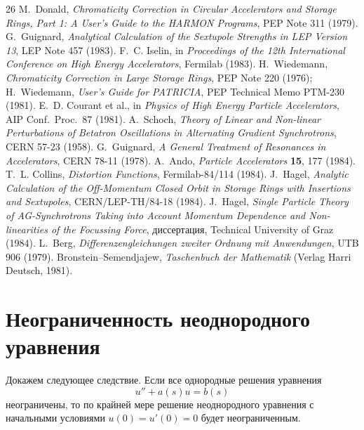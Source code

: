 \documentclass[11pt,a4paper]{article}
\begin{document}
\begin{thebibliography}{26}
M.~Donald, \textit{Chromaticity Correction in Circular Accelerators and Storage
Rings, Part 1: A User's Guide to the HARMON Programs}, PEP Note 311 (1979).
G.~Guignard, \textit{Analytical Calculation of the Sextupole Strengths in LEP
Version 13}, LEP Note 457 (1983).
F.~C. Iselin, in \textit{Proceedings of the 12th International Conference on High
Energy Accelerators}, Fermilab (1983).
H.~Wiedemann, \textit{Chromaticity Correction in Large Storage Rings}, PEP Note
220 (1976); H.~Wiedemann, \textit{User's Guide for PATRICIA}, PEP Technical Memo
PTM-230 (1981).
E.~D. Courant et al., in \textit{Physics of High Energy Particle Accelerators},
AIP Conf.\ Proc.\ 87 (1981).
A.~Schoch, \textit{Theory of Linear and Non-linear Perturbations of Betatron
Oscillations in Alternating Gradient Synchrotrons}, CERN 57-23 (1958).
G.~Guignard, \textit{A General Treatment of Resonances in Accelerators}, CERN
78-11 (1978).
A.~Ando, \textit{Particle Accelerators} \textbf{15}, 177 (1984).
T.~L. Collins, \textit{Distortion Functions}, Fermilab-84/114 (1984).
J.~Hagel, \textit{Analytic Calculation of the Off-Momentum Closed Orbit in Storage
Rings with Insertions and Sextupoles}, CERN/LEP-TH/84-18 (1984).
J.~Hagel, \textit{Single Particle Theory of AG-Synchrotrons Taking into Account
Momentum Dependence and Non-linearities of the Focussing Force}, диссертация,
Technical University of Graz (1984).
L.~Berg, \textit{Differenzengleichungen zweiter Ordnung mit Anwendungen}, UTB 906
(1979).
Bronstein--Semendjajew, \textit{Taschenbuch der Mathematik} (Verlag Harri Deutsch,
1981).
\end{thebibliography}

\appendix
\section{Неограниченность неоднородного уравнения}

Докажем следующее следствие. Если все однородные решения уравнения
\begin{equation}
u''+a(s)u=b(s)
\end{equation}
неограничены, то по крайней мере решение неоднородного уравнения с начальными
условиями $u(0)=u'(0)=0$ будет неограниченным.
\end{document}
